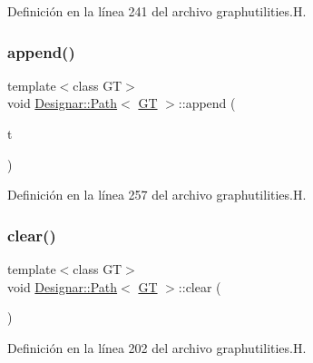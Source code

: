 Definición en la línea 241 del archivo graphutilities.\+H.

\mbox{\label{class_designar_1_1_path_a0e69c5a5e1fffd17059b236e13f6587a}} 
\subsubsection{\texorpdfstring{append()}{append()}\hspace{0.1cm}{\footnotesize\ttfamily [2/2]}}
{\footnotesize\ttfamily template$<$class GT$>$ \\
void \hyperlink{class_designar_1_1_path}{Designar\+::\+Path}$<$ \hyperlink{demo-buildgraph_8_c_a3001c40d2c31ca87ed96cd7d1334a55e}{GT} $>$\+::append (\begin{DoxyParamCaption}\item[{\hyperlink{class_designar_1_1_path_a7b499fd50e96e3360968d4cfef7a3736}{Node\+Type} \&}]{t }\end{DoxyParamCaption})\hspace{0.3cm}{\ttfamily [inline]}}



Definición en la línea 257 del archivo graphutilities.\+H.

\mbox{\label{class_designar_1_1_path_acc2f49cce82c42701cb703c6d87f6dc2}} 
\subsubsection{\texorpdfstring{clear()}{clear()}}
{\footnotesize\ttfamily template$<$class GT$>$ \\
void \hyperlink{class_designar_1_1_path}{Designar\+::\+Path}$<$ \hyperlink{demo-buildgraph_8_c_a3001c40d2c31ca87ed96cd7d1334a55e}{GT} $>$\+::clear (\begin{DoxyParamCaption}{ }\end{DoxyParamCaption})\hspace{0.3cm}{\ttfamily [inline]}}



Definición en la línea 202 del archivo graphutilities.\+H.

\mbox{\label{class_designar_1_1_path_a72950bc3852a17d423982d55326b2382}} 
